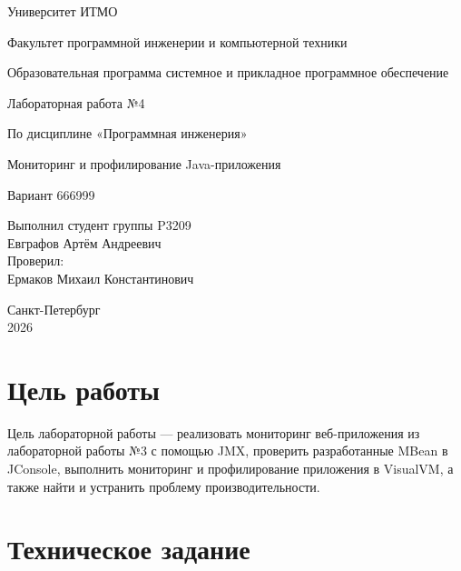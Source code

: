 \documentclass[a4paper,14pt]{extarticle}
\begin{document}
\thispagestyle{empty}

\begin{titlepage}
    \begin{center}
        {\large Университет ИТМО\par}
        \vspace{0.5cm}
        {\large Факультет программной инженерии и компьютерной техники\par}
        {\large Образовательная программа системное и прикладное программное обеспечение\par}
        \vspace{3cm}
        {\LARGE Лабораторная работа №4\par}
        \vspace{0.5cm}
        {\Large По дисциплине «Программная инженерия»\par}
        {\Large Мониторинг и профилирование Java-приложения\par}
        {\Large Вариант 666999\par}
        \vspace{2cm}
    \end{center}

    \begin{flushright}
        Выполнил студент группы P3209\\
        Евграфов Артём Андреевич\\
        Проверил:\\
        Ермаков Михаил Константинович
    \end{flushright}

    \vfill
    \begin{center}
        Санкт-Петербург\\
        2026
    \end{center}
\end{titlepage}

\tableofcontents
\newpage

\section{Цель работы}

Цель лабораторной работы — реализовать мониторинг веб-приложения из лабораторной работы №3 с помощью JMX, проверить разработанные MBean в JConsole, выполнить мониторинг и профилирование приложения в VisualVM, а также найти и устранить проблему производительности.

\section{Техническое задание}
\end{document}
